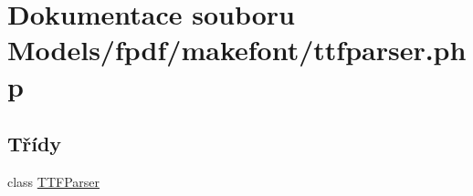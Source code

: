 \hypertarget{ttfparser_8php}{\section{Dokumentace souboru Models/fpdf/makefont/ttfparser.php}
\label{ttfparser_8php}
}
\subsection*{Třídy}
\begin{DoxyCompactItemize}
\item 
class \hyperlink{class_t_t_f_parser}{T\-T\-F\-Parser}
\end{DoxyCompactItemize}
